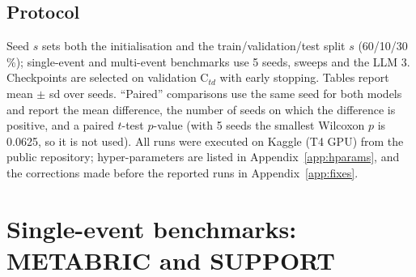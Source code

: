 \documentclass[11pt,a4paper]{article}
\newcommand{\Ctd}{C$_{td}$}
\begin{document}
\subsection{Protocol}
Seed $s$ sets both the initialisation and the train/validation/test split $s$ (60/10/30\,\%); single-event and
multi-event benchmarks use 5 seeds, sweeps and the LLM 3. Checkpoints are selected on validation \Ctd{} with early
stopping. Tables report mean $\pm$ sd over seeds. ``Paired'' comparisons use the same seed for both models and report
the mean difference, the number of seeds on which the difference is positive, and a paired $t$-test $p$-value
(with 5 seeds the smallest Wilcoxon $p$ is 0.0625, so it is not used). All runs were executed on Kaggle (T4 GPU) from
the public repository; hyper-parameters are listed in Appendix~\ref{app:hparams}, and the corrections made before the
reported runs in Appendix~\ref{app:fixes}.

\section{Single-event benchmarks: METABRIC and SUPPORT}\label{sec:single}
\end{document}
